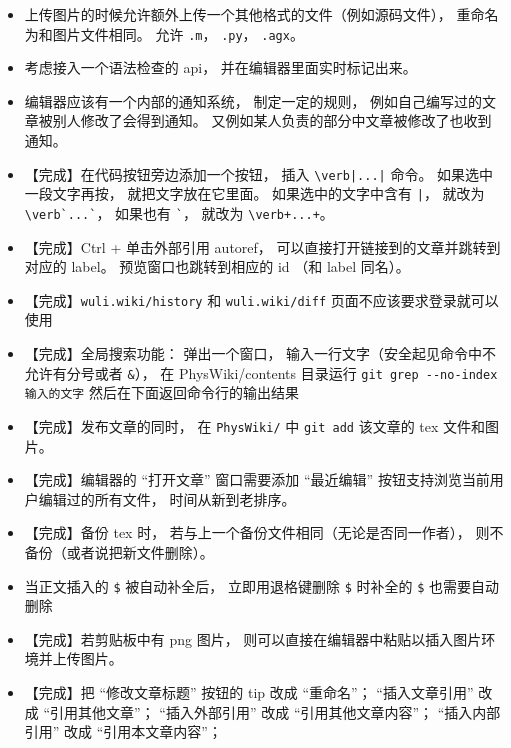 \begin{itemize}
\item 上传图片的时候允许额外上传一个其他格式的文件（例如源码文件）， 重命名为和图片文件相同。 允许 \verb`.m`， \verb`.py`， \verb`.agx`。

\item 考虑接入一个语法检查的 api， 并在编辑器里面实时标记出来。

\item 编辑器应该有一个内部的通知系统， 制定一定的规则， 例如自己编写过的文章被别人修改了会得到通知。 又例如某人负责的部分中文章被修改了也收到通知。

\item 【完成】在代码按钮旁边添加一个按钮， 插入 \verb`\verb|...|` 命令。 如果选中一段文字再按， 就把文字放在它里面。 如果选中的文字中含有 \verb`|`， 就改为 \verb|\verb`...`|， 如果也有 \verb|`|， 就改为 \verb`\verb+...+`。

\item 【完成】Ctrl + 单击外部引用 autoref， 可以直接打开链接到的文章并跳转到对应的 label。 预览窗口也跳转到相应的 id （和 label 同名）。

\item 【完成】\verb`wuli.wiki/history` 和 \verb`wuli.wiki/diff` 页面不应该要求登录就可以使用

\item 【完成】全局搜索功能： 弹出一个窗口， 输入一行文字（安全起见命令中不允许有分号或者 \verb`&`）， 在 PhysWiki/contents 目录运行 \verb`git grep --no-index 输入的文字` 然后在下面返回命令行的输出结果

\item 【完成】发布文章的同时， 在 \verb`PhysWiki/` 中 \verb`git add` 该文章的 tex 文件和图片。

\item 【完成】编辑器的 “打开文章” 窗口需要添加 “最近编辑” 按钮支持浏览当前用户编辑过的所有文件， 时间从新到老排序。

\item 【完成】备份 tex 时， 若与上一个备份文件相同（无论是否同一作者）， 则不备份（或者说把新文件删除）。
\item 当正文插入的 \verb`$` 被自动补全后， 立即用退格键删除 \verb`$` 时补全的 \verb`$` 也需要自动删除

\item 【完成】若剪贴板中有 png 图片， 则可以直接在编辑器中粘贴以插入图片环境并上传图片。

\item 【完成】把 “修改文章标题” 按钮的 tip 改成 “重命名”； “插入文章引用” 改成 “引用其他文章”； “插入外部引用” 改成 “引用其他文章内容”； “插入内部引用” 改成 “引用本文章内容”；


\end{itemize}
